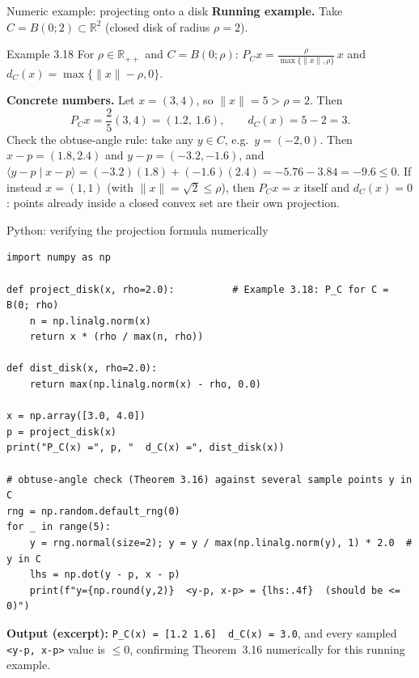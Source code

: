 \documentclass[aspectratio=169,10pt]{beamer}
\newcommand{\R}{\mathbb{R}}
\newcommand{\Rpp}{\mathbb{R}_{++}}
\newcommand{\ip}[2]{\langle #1 \mid #2 \rangle}
\newcommand{\norm}[1]{\lVert #1 \rVert}
\newcommand{\dC}{d_C}
\newcommand{\PC}{P_C}
\begin{document}
\begin{frame}{Numeric example: projecting onto a disk}
  \textbf{Running example.} Take $C = B(0;2)\subset\R^2$ (closed disk of
  radius $\rho=2$).
  \begin{block}{Example 3.18}
    For $\rho\in\Rpp$ and $C=B(0;\rho)$: $\displaystyle \PC x =
    \frac{\rho}{\max\{\norm x,\rho\}}\,x$ and $\dC(x)=\max\{\norm x-\rho,0\}$.
  \end{block}
  \textbf{Concrete numbers.} Let $x=(3,4)$, so $\norm x = 5 > \rho=2$. Then
  \[
    \PC x = \frac{2}{5}(3,4) = (1.2,\ 1.6), \qquad \dC(x) = 5-2 = 3.
  \]
  Check the obtuse-angle rule: take any $y\in C$, e.g.\ $y=(-2,0)$. Then
  $x-p = (1.8,2.4)$ and $y-p=(-3.2,-1.6)$, and
  $\ip{y-p}{x-p} = (-3.2)(1.8)+(-1.6)(2.4) = -5.76-3.84=-9.6 \le 0$. If
  instead $x=(1,1)$ (with $\norm x=\sqrt2 \le \rho$), then $\PC x = x$
  itself and $\dC(x)=0$: points already inside a closed convex set are their
  own projection.
\end{frame}

\begin{frame}[fragile]{Python: verifying the projection formula numerically}
\begin{lstlisting}
import numpy as np

def project_disk(x, rho=2.0):          # Example 3.18: P_C for C = B(0; rho)
    n = np.linalg.norm(x)
    return x * (rho / max(n, rho))

def dist_disk(x, rho=2.0):
    return max(np.linalg.norm(x) - rho, 0.0)

x = np.array([3.0, 4.0])
p = project_disk(x)
print("P_C(x) =", p, "  d_C(x) =", dist_disk(x))

# obtuse-angle check (Theorem 3.16) against several sample points y in C
rng = np.random.default_rng(0)
for _ in range(5):
    y = rng.normal(size=2); y = y / max(np.linalg.norm(y), 1) * 2.0  # y in C
    lhs = np.dot(y - p, x - p)
    print(f"y={np.round(y,2)}  <y-p, x-p> = {lhs:.4f}  (should be <= 0)")
\end{lstlisting}
\medskip
\textbf{Output (excerpt):} \texttt{P\_C(x) = [1.2 1.6]\ \ d\_C(x) = 3.0}, and
every sampled \texttt{<y-p, x-p>} value is $\le 0$, confirming Theorem~3.16
numerically for this running example.
\end{frame}
\end{document}
